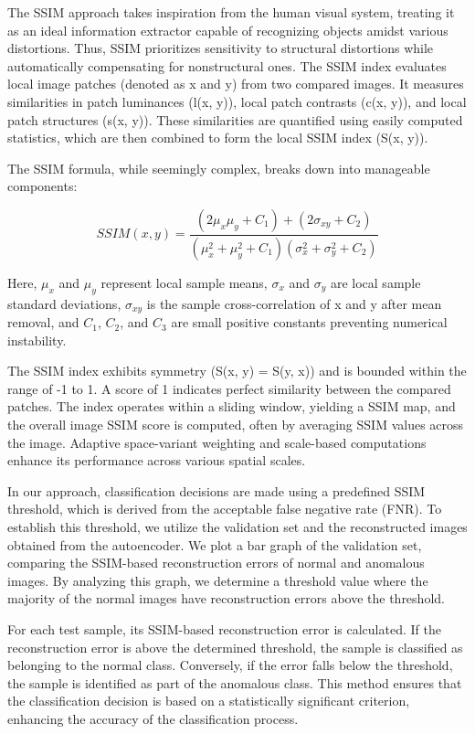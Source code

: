 \documentclass[journal,11pt,onecolumn,draftcls]{IEEEtran}
\begin{document}
The SSIM approach takes inspiration from the human visual system, treating it as an ideal information extractor capable of recognizing objects amidst various distortions. Thus, SSIM prioritizes sensitivity to structural distortions while automatically compensating for nonstructural ones. The SSIM index evaluates local image patches (denoted as x and y) from two compared images. It measures similarities in patch luminances (l(x, y)), local patch contrasts (c(x, y)), and local patch structures (s(x, y)). These similarities are quantified using easily computed statistics, which are then combined to form the local SSIM index (S(x, y)).

The SSIM formula, while seemingly complex, breaks down into manageable components:

\begin{equation}
SSIM(x, y) = \frac{(2\mu_x\mu_y + C_1) + (2\sigma_{xy} + C_2)}{(\mu_x^2 + \mu_y^2 + C_1)(\sigma_x^2 + \sigma_y^2 + C_2)}
\end{equation}

Here, $\mu_x$ and $\mu_y$ represent local sample means, $\sigma_x$ and $\sigma_y$ are local sample standard deviations, $\sigma_{xy}$ is the sample cross-correlation of x and y after mean removal, and $C_1$, $C_2$, and $C_3$ are small positive constants preventing numerical instability.

The SSIM index exhibits symmetry (S(x, y) = S(y, x)) and is bounded within the range of -1 to 1. A score of 1 indicates perfect similarity between the compared patches. The index operates within a sliding window, yielding a SSIM map, and the overall image SSIM score is computed, often by averaging SSIM values across the image. Adaptive space-variant weighting and scale-based computations enhance its performance across various spatial scales.

In our approach, classification decisions are made using a predefined SSIM threshold, which is derived from the acceptable false negative rate (FNR). To establish this threshold, we utilize the validation set and the reconstructed images obtained from the autoencoder. We plot a bar graph of the validation set, comparing the SSIM-based reconstruction errors of normal and anomalous images. By analyzing this graph, we determine a threshold value where the majority of the normal images have reconstruction errors above the threshold.

For each test sample, its SSIM-based reconstruction error is calculated. If the reconstruction error is above the determined threshold, the sample is classified as belonging to the normal class. Conversely, if the error falls below the threshold, the sample is identified as part of the anomalous class. This method ensures that the classification decision is based on a statistically significant criterion, enhancing the accuracy of the classification process.
\end{document}
